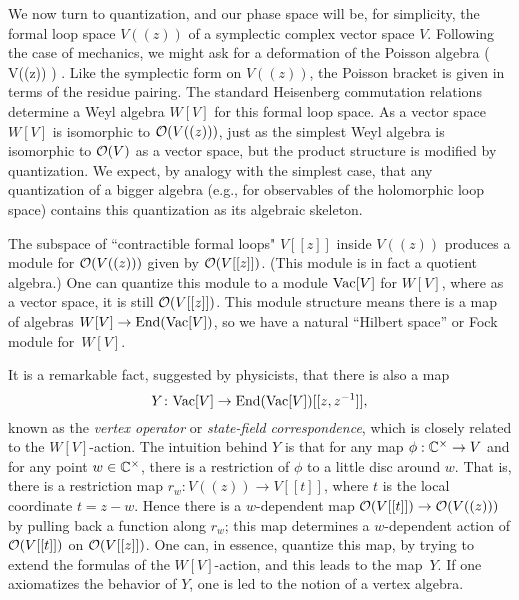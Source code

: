 \documentclass[11pt]{amsart}
\begin{document}
We now turn to quantization, and our phase space will be, for simplicity, the formal loop space $V((z))$ of a symplectic complex vector space $V$.
Following the case of mechanics, we might ask for a deformation of the Poisson algebra
\beqn
\cO\left( V((z)) \right) .
\eeqn
Like the symplectic form on $V((z))$, the Poisson bracket is given in terms of the residue pairing.
The standard Heisenberg commutation relations determine a Weyl algebra $W[V]$ for this formal loop space.
As a vector space $W[V]$ is isomorphic to $\mathcal O(V((z)))$, 
just as the simplest Weyl algebra is isomorphic to $\mathcal O(V)$ as a vector space,
but the product structure is modified by quantization.
We expect, by analogy with the simplest case, that any quantization of a bigger algebra (e.g., for observables of the holomorphic loop space) contains this quantization as its algebraic skeleton.

The subspace of ``contractible formal loops" $V[[z]]$ inside $V((z))$ produces a module for $\mathcal O(V((z)))$ given by $\mathcal O(V[[z]])$. 
(This module is in fact a quotient algebra.)
One can quantize this module to a module ${\rm Vac}[V]$ for $W[V]$,
where as a vector space, it is still $\mathcal O(V[[z]])$.
This module structure means there is a map of algebras $W[V] \to {\rm End}({\rm Vac}[V])$,
so we have a natural ``Hilbert space'' or Fock module for~$W[V]$.

It is a remarkable fact, suggested by physicists, that there is also a map
\[
Y \colon {\rm Vac}[V] \to {\rm End}({\rm Vac}[V])[[z, z^{-1}]],
\]
known as the {\em vertex operator} or {\em state-field correspondence},
which is closely related to the $W[V]$-action.
The intuition behind $Y$ is that for any map $\phi: \mathbb C^\times \to V$ and for any point $w \in \mathbb C^\times$, 
there is a restriction of $\phi$ to a little disc around $w$.
That is, there is a restriction map $r_w: V((z)) \to V[[t]]$, where $t$ is the local coordinate $t = z-w$.
Hence there is a $w$-dependent map $\mathcal O(V[[t]]) \to \mathcal O(V((z)))$ by pulling back a function along $r_w$;
this map determines a $w$-dependent action of $\mathcal O(V[[t]])$ on $\mathcal O(V[[z]])$.
One can, in essence, quantize this map, by trying to extend the formulas of the $W[V]$-action,
and this leads to the map~$Y$.
If one axiomatizes the behavior of $Y$, one is led to the notion of a vertex algebra.
\end{document}
